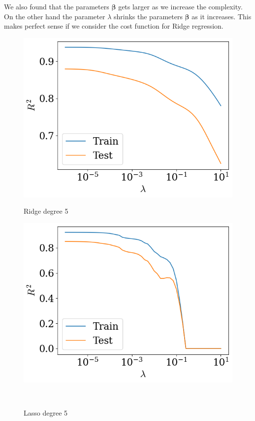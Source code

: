 \documentclass[twoside,11pt]{report}
\begin{document}
We also found that the parameters $\boldsymbol{\beta}$ gets larger as we increase the complexity. On the other hand
the parameter $\lambda$ shrinks the parameters $\boldsymbol{\beta}$ as it increases. This makes perfect sense if we
consider the cost function for Ridge regression. 
\begin{figure}[!h]
\begin{minipage}[!t]{.48\linewidth}
    \begin{center}
        \includegraphics[width=1.0\textwidth]{../runsAndAdditions/R2OverLambdaRidge5.png}
        \caption{Ridge degree 5}\label{fig:R2OverLambdaRidge5}
\end{center}
\end{minipage}
\hspace{4mm}
\begin{minipage}[!t]{.48\linewidth}
    \begin{center}
        \includegraphics[width=1.0\textwidth]{../runsAndAdditions/R2OverLambdaLasso5.png}
        \caption{Lasso degree 5}\label{fig:R2OverLambdaLasso5}
    \end{center}
\end{minipage}\\
\end{figure}
\end{document}
